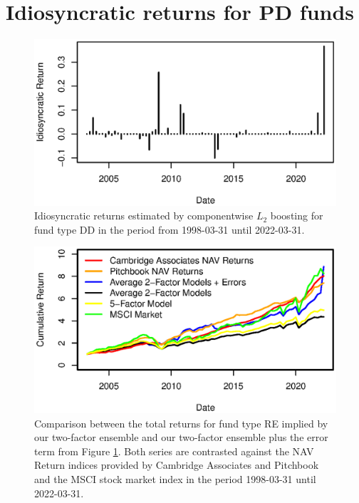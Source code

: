 \section{Idiosyncratic returns for PD funds}
\label{sec:PD_errors}


\begin{figure}[H]
	\centering
	\includegraphics{Figures/XErrorSeriesPD}
	\caption{Idiosyncratic returns estimated by componentwise $L_2$ boosting for fund type DD in the period from 1998-03-31 until 2022-03-31.}
	\label{fig:clb_idio_PD}
\end{figure}

\begin{figure}[H]
	\centering
	\includegraphics{Figures/XTotalErrorSeriesPD}
	\caption{
		Comparison between the total returns for fund type RE implied by our two-factor ensemble and our two-factor ensemble plus the error term from Figure \ref{fig:clb_idio_PD}.
		Both series are contrasted against the NAV Return indices provided by Cambridge Associates and Pitchbook and the MSCI stock market index in the period 1998-03-31 until 2022-03-31.
	}
	\label{fig:clb_total_PD}
\end{figure}

